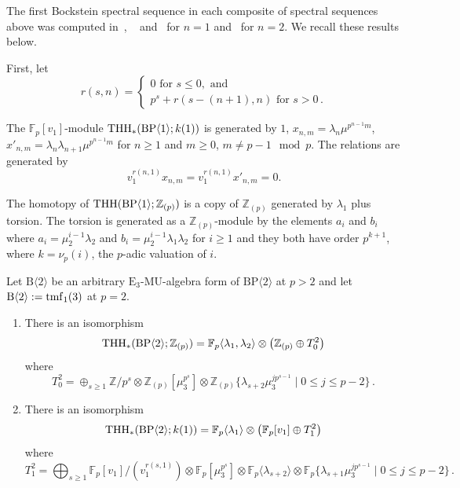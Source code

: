 The first Bockstein spectral sequence in each composite of spectral sequences above was computed in~\cite{MS}, ~\cite{AR} and~\cite{AHL} for $n=1$ and~\cite{ACH24} for $n=2$. We recall these results below. 

First, let 
\[ 
r(s,n) = \begin{cases} 
0 \text{ for }s\le 0, \text{ and } \\ 
p^{s}+r(s-(n+1),n) \text{ for }s>0\,. 
\end{cases}
\]

\begin{theorem}
The $\mathbb{F}_p[v_1]$-module $\operatorname{THH}_*(\mathrm{BP}\langle 1\rangle; k(1))$ is generated by $1$, $x_{n,m}=\lambda_n\mu^{p^{n-1}m}$, $x'_{n,m}=\lambda_n\lambda_{n+1}\mu^{p^{n-1}m}$ for $n\ge 1$ and $m\ge 0$, $m\ne p-1\mod p$. 
The relations are generated by 
\[ 
v_1^{r(n,1)}x_{n,m}=v_1^{r(n,1)}x'_{n,m}=0.
\]
\end{theorem}

\begin{theorem}
The homotopy of $\operatorname{THH}(\mathrm{BP}\langle 1\rangle;\mathbb{Z}_{(p)})$ is a copy of $\mathbb{Z}_{(p)}$ generated by $\lambda_1$ plus torsion. The torsion is generated as a $\mathbb{Z}_{(p)}$-module by the
elements $a_i$ and $b_i$ where $a_i=\mu_2^{i-1}\lambda_2$ and $b_i=\mu_2^{i-1}\lambda_1\lambda_2$ for $i\ge 1$ and they both have order $p^{k+1}$, where $k= \nu_{p}(i)$, the
$p$-adic valuation of $i$.
\end{theorem}

\begin{theorem}
Let $\mathrm{B}\langle 2\rangle$ be an arbitrary $\mathrm{E}_3$-$\mathrm{MU}$-algebra form of $\mathrm{BP}\langle 2\rangle$ at $p>2$ and let $\mathrm{B}\langle 2\rangle:=\mathrm{tmf}_1(3)$ at $p=2$. 
\begin{enumerate}
\item There is an isomorphism 
\[ 
\operatorname{THH}_*(\mathrm{BP}\langle 2\rangle ;\mathbb{Z}_{(p)})=\mathbb{F}_p\langle \lambda_1 ,\lambda_2\rangle \otimes \left ( \mathbb{Z}_{(p)}\oplus T_0^2 \right )
\]
where 
\[ T_0^2 = \oplus_{s\ge 1} \mathbb{Z}/p^s\otimes \mathbb{Z}_{(p)}[\mu_3^{p^s}]\otimes \mathbb{Z}_{(p)}\{\lambda_{s+2}\mu_3^{jp^{s-1}} \mid 0\le j\le p-2 \} \,. 
\]
\item There is an isomorphism
\[
\operatorname{THH}_*(\mathrm{BP}\langle 2\rangle ;k(1))= \mathbb{F}_p\langle \lambda_1 \rangle \otimes \left ( \mathbb{F}_p[v_1]\oplus T_1^2 \right ) 
\]
where 
\[ 
T_1^2=\bigoplus_{s\ge 1}\mathbb{F}_p[v_1]/(v_1^{r(s,1)})\otimes \mathbb{F}_p[\mu_3^{p^s}]\otimes \mathbb{F}_p\langle \lambda_{s+2}\rangle \otimes \mathbb{F}_p\{ \lambda_{s+1}\mu_3^{jp^{s-1}} \mid 0\le j\le p-2 \} \,.
\]
\end{enumerate}
\end{theorem}

